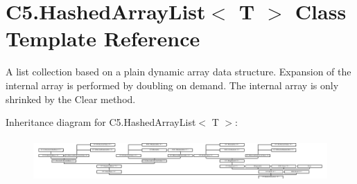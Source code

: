 \hypertarget{class_c5_1_1_hashed_array_list}{}\section{C5.\+Hashed\+Array\+List$<$ T $>$ Class Template Reference}
\label{class_c5_1_1_hashed_array_list}


A list collection based on a plain dynamic array data structure. Expansion of the internal array is performed by doubling on demand. The internal array is only shrinked by the Clear method.  


Inheritance diagram for C5.\+Hashed\+Array\+List$<$ T $>$\+:\begin{figure}[H]
\begin{center}
\leavevmode
\includegraphics[height=1.673069cm]{class_c5_1_1_hashed_array_list}
\end{center}
\end{figure}
